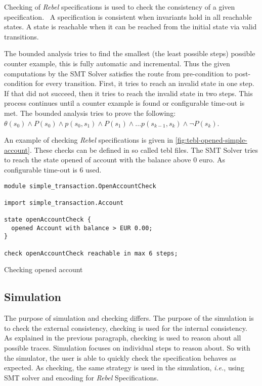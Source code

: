 Checking of \textit{Rebel} specifications is used to check the consistency of a given specification.~\cite[p.~5]{stoel_storm_vinju_bosman_2016} A specification is consistent when invariants hold in all reachable states. A state is reachable when it can be reached from the initial state via valid transitions.

The bounded analysis tries to find the smallest (the least possible steps) possible counter example, this is fully automatic and incremental. Thus the given computations by the SMT Solver satisfies the route from pre-condition to post-condition for every transition.
First, it tries to reach an invalid state in one step. If that did not succeed, then it tries to reach the invalid state in two steps. This process continues until a counter example is found or configurable time-out is met. The bounded analysis tries to prove the following: $\theta (s_{0}) \land P(s_{0}) \land p(s_{0}, s_{1}) \land P(s_{1}) \land \dots p(s_{k-1}, s_{k}) \land \neg P(s_{k})$.

An example of checking \textit{Rebel} specifications is given in \autoref{fig:tebl-opened-simple-account}. These checks can be defined in so called tebl files. The SMT Solver tries to reach the state opened of account with the balance above 0 euro. As configurable time-out is 6 used.

\begin{sourcecode}[h!]
\begin{lstlisting}[]
module simple_transaction.OpenAccountCheck

import simple_transaction.Account

state openAccountCheck {
  opened Account with balance > EUR 0.00;
}

check openAccountCheck reachable in max 6 steps;
\end{lstlisting}
\caption{Checking opened account}
\label{fig:tebl-opened-simple-account}
\end{sourcecode}
\FloatBarrier

\subsection{Simulation}
The purpose of simulation and checking differs. The purpose of the simulation is to check the external consistency, checking is used for the internal consistency.~\cite[p.~5]{stoel_storm_vinju_bosman_2016} As explained in the previous paragraph, checking is used to reason about all possible traces. Simulation focuses on individual steps to reason about. So with the simulator, the user is able to quickly check the specification behaves as expected. As checking, the same strategy is used in the simulation, \textit{i.e.}, using SMT solver and encoding for \textit{Rebel} Specifications.
